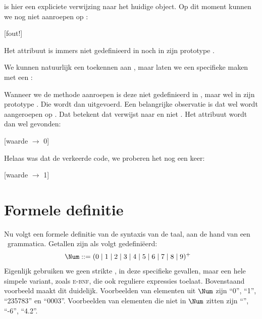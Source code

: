  is hier een expliciete verwijzing naar het huidige object. Op dit moment kunnen we  nog niet aanroepen op :

\begin{codelines}
  [fout!]
\end{codelines}

Het attribuut  is immers niet gedefinieerd in  noch in zijn prototype .

We kunnen natuurlijk een  toekennen aan , maar laten we een specifieke  maken met een :

\begin{codelines}
\end{codelines}

Wanneer we de methode  aanroepen is deze niet gedefinieerd in , maar wel in zijn prototype . Die wordt dan uitgevoerd. Een belangrijke observatie is dat  wel wordt aangeroepen op . Dat betekent dat  verwijst naar  en niet . Het attribuut  wordt dan wel gevonden:

\begin{codelines}
  [waarde $\to$ 0]
\end{codelines}

Helaas was dat de verkeerde code, we proberen het nog een keer:

\begin{codelines}
  [waarde $\to$ 1]
\end{codelines}


\section{Formele definitie}

Nu volgt een formele definitie van de syntaxis van de taal, aan de hand van een \BNF\ grammatica. Getallen zijn als volgt gedefiniëerd:
%
\begin{align*}
  \Num \GrammarDef (0 \mid 1 \mid 2 \mid 3 \mid 4 \mid 5 \mid 6 \mid 7 \mid 8 \mid 9)^+
\end{align*}
%
Eigenlijk gebruiken we geen strikte \BNF, in deze specifieke gevallen, maar een hele simpele variant, zoals \textsc{e-bnf}, die ook reguliere expressies toelaat. Bovenstaand voorbeeld maakt dit duidelijk. Voorbeelden van elementen uit $\Num$ zijn ``0'', ``1'', ``235783'' en ``0003''. Voorbeelden van elementen die niet in $\Num$ zitten zijn ``'', ``-6'', ``4.2''.

